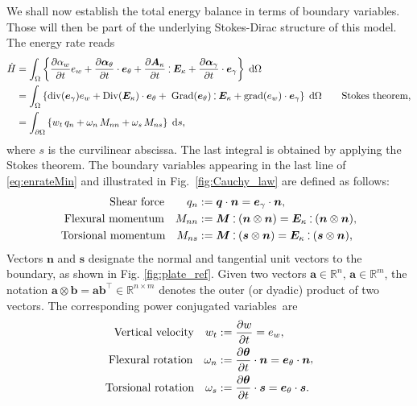 We shall now establish the total energy balance in terms of boundary variables. Those will then be part of the underlying Stokes-Dirac structure of this model. The energy rate reads
\begin{equation}
\label{eq:enrateMin}
\begin{aligned}
\dot{H}&= \int_{\Omega} \left\{ \diffp{\alpha_w}{t} e_w  + \diffp{\bm\alpha_\theta}{t} \cdot \bm{e}_\theta + \diffp{\bm{A}_{\kappa}}{t} \cddot \bm{E}_{\kappa}  + \diffp{\bm\alpha_{\gamma}}{t} \cdot \bm{e}_{\gamma} \right\} \d\Omega\\
&= \int_{\Omega} \left\{ \div(\bm{e}_{\gamma}) e_w  + \Div(\bm{E}_{\kappa}) \cdot \bm{e}_\theta + \; \Grad(\bm{e}_{\theta}) \cddot \bm{E}_{\kappa}  + \grad (e_w) \cdot \bm{e}_{\gamma} \right\} \d\Omega \qquad \text{Stokes theorem,} \\
&= \int_{\partial \Omega} \left\{ w_t \, q_n  + \omega_n \, M_{nn} + \omega_s \, M_{ns} \right\} \d{s},  \\
\end{aligned}
\end{equation}
where $s$ is the curvilinear abscissa. The last integral is obtained by applying the Stokes theorem. The boundary variables appearing in the last line of \eqref{eq:enrateMin} and illustrated in Fig.~\ref{fig:Cauchy_law} are defined as follows:
\begin{equation}
\label{eq:QnMnnMns}
\begin{aligned}
\text{Shear force}  \qquad q_{n} &:= \bm{q} \cdot \bm{n}=  \bm{e}_{\gamma} \cdot \bm{n},  \\
\text{Flexural momentum} \quad 
M_{nn} &:=  \bm{M} \cddot (\bm{n}\otimes{\bm{n}}) = \bm{E}_{\kappa} \cddot (\bm{n}\otimes{\bm{n}}) 	\\
\text{Torsional momentum} \quad M_{ns} &:= \bm{M} \cddot (\bm{s}\otimes{\bm{n}}) = \bm{E}_{\kappa} \cddot (\bm{s}\otimes{\bm{n}}),	
\end{aligned},
\end{equation}
Vectors $\bm{n}$ and $\bm{s}$ designate the normal and tangential unit vectors to the boundary, as shown in Fig. \ref{fig:plate_ref}. Given two vectors $\bm{a} \in \mathbb{R}^n, \, \bm{a} \in \mathbb{R}^m$, the notation $\bm{a}\otimes{\bm{b}} = \bm{a} \bm{b}^\top \in \mathbb{R}^{n\times m}$ denotes the outer (or dyadic) product of two vectors.  The corresponding power conjugated variables~are
\begin{equation} 
\label{eq:wtwnws}
\begin{aligned}
\text{Vertical velocity}  \quad w_t &:= \diffp{w}{t} = e_w, \\
\text{Flexural rotation} \quad 
\omega_{n} &:= \diffp{\bm{\theta}}{t} \cdot \bm{n} = \bm{e}_\theta \cdot \bm{n} \\
\text{Torsional rotation} \quad 
\omega_{s} &:= \diffp{\bm{\theta}}{t} \cdot \bm{s} = \bm{e}_\theta \cdot \bm{s}.	
\end{aligned},
\end{equation}

